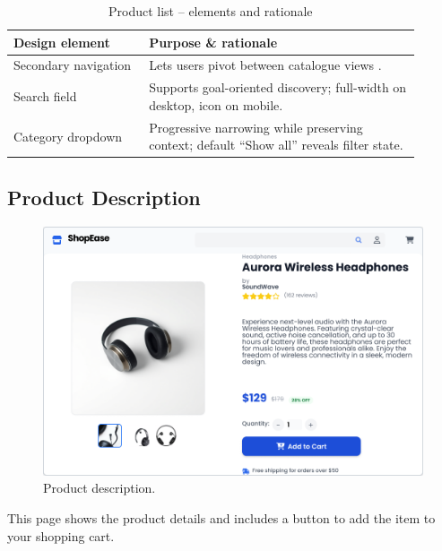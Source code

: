 \documentclass[12pt]{article}
\begin{document}
	\begin{table}[H]
		\centering
		\caption{Product list – elements and rationale}
		\label{tab:product-elements}
		\begin{tabular}{p{0.30\linewidth} p{0.60\linewidth}}
			\toprule
			\textbf{Design element} & \textbf{Purpose \& rationale} \\ \midrule
			Secondary navigation    & Lets users pivot between catalogue views .\\
			Search field            & Supports goal-oriented discovery; full-width on desktop, icon on mobile.\\
			Category dropdown       & Progressive narrowing while preserving context; default “Show all” reveals filter state.\\

	
			\bottomrule
		\end{tabular}
	\end{table}

	\subsection{Product Description}\label{subsec:product-description}

	\begin{figure}[H]
		\centering
		\includegraphics[width=\linewidth]{pictures/main/Product_Description_Figma}
		\caption{Product description.}
		\label{fig:ui-products_description}
	\end{figure}

This page shows the product details and includes a button to add the item to your shopping cart.


\end{document}
